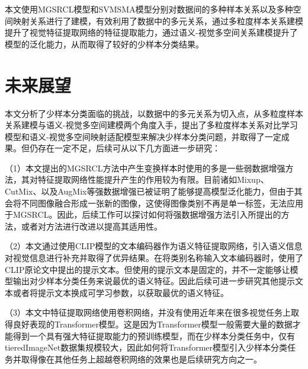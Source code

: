本文使用MGSRCL模型和SVMSMA模型分别对数据间的多种样本关系以及多种空间映射关系进行了建模，有效利用了数据中的多元关系，通过多粒度样本关系建模提升了视觉特征提取网络的特征提取能力，通过语义-视觉多空间关系建模提升了模型的泛化能力，从而取得了较好的少样本分类结果。

\section[\hspace{-2pt}未来展望]{{\heiti{} \hspace{-8pt}未来展望}}\label{section5: 未来展望}

本文分析了少样本分类面临的挑战，以数据中的多元关系为切入点，从多粒度样本关系建模与语义-视觉多空间建模两个角度入手，提出了多粒度样本关系对比学习模型和语义-视觉多空间映射适配模型来解决少样本分类问题，并取得了一定成果。但仍存在一定不足，后续可从以下几方面进一步研究：

（1）本文提出的MGSRCL方法中产生变换样本时使用的多是一些弱数据增强方法，其对特征提取网络性能提升产生的作用较为有限。目前诸如Mixup、CutMix、以及AugMix等强数据增强已被证明了能够提高模型泛化能力，但由于其会将不同图像融合形成一张新的图像，这使得图像类别不再是单一标签，无法应用于MGSRCL。因此，后续工作可以探讨如何将强数据增强方法引入所提出的方法，或者对方法进行改进以提高其适用性。

（2）本文通过使用CLIP模型的文本编码器作为语义特征提取网络，引入语义信息对视觉信息进行补充并取得了优异结果。在将类别名称输入文本编码器时，使用了CLIP原论文中提出的提示文本。但使用的提示文本是固定的，并不一定能够让模型输出对少样本分类任务来说最优的语义特征。因此后续可进一步研究其他提示文本或者将提示文本换成可学习参数，以获取最优的语义特征。

（3）本文中特征提取网络使用卷积网络，并没有使用近年来在很多视觉任务上取得良好表现的Transformer模型。这是因为Transformer模型一般需要大量的数据才能得到一个具有强大特征提取能力的预训练模型，而在少样本分类任务中，仅有tieredImageNet数据集规模较大，因此如何将Transformer模型引入少样本分类任务并取得像在其他任务上超越卷积网络的效果也是后续研究方向之一。